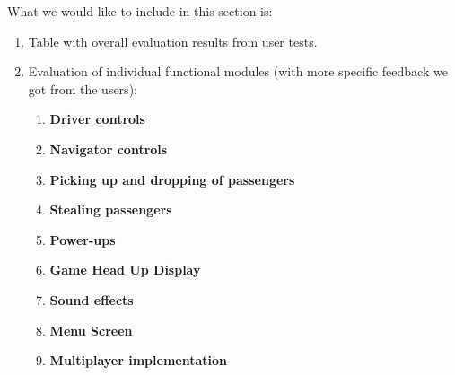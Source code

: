 What we would like to include in this section is:
\begin{enumerate}
	\item Table with overall evaluation results from user tests.
	\item Evaluation of individual functional modules (with more specific feedback we got from the users):
	\begin{enumerate}
		\item \textbf{Driver controls} 
		\item \textbf{Navigator controls}
		\item \textbf{Picking up and dropping of passengers}
		\item \textbf{Stealing passengers}
		\item \textbf{Power-ups}
		\item \textbf{Game Head Up Display}
		\item \textbf{Sound effects}
		\item \textbf{Menu Screen}
		\item \textbf{Multiplayer implementation}
	\end{enumerate}
\end{enumerate}